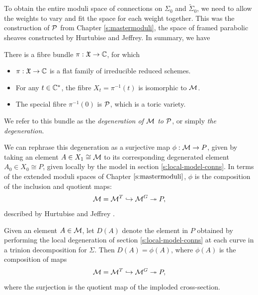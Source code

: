	To obtain the entire moduli space of connections on $\Sigma_0$ and $\tilde{\Sigma}_0$, we need to allow the weights to vary and fit the space for each weight together. This was the construction of $\mathcal{P}$ from Chapter \ref{s:mastermoduli}, the space of framed parabolic sheaves constructed by Hurtubise and Jeffrey. In summary, we have \cite[Theorems 3.17, 4.1]{biswas_degenerations_2021}
	\begin{theorem}
		\label{t:bishurt}
		There is a fibre bundle $\pi: \mathfrak{X} \to \mathbb{C}$, for which
		\begin{itemize}
			\item $\pi:\mathfrak{X}\to \mathbb{C}$ is a flat family of irreducible reduced schemes.
			\item For any $t\in \mathbb{C}^\ast$, the fibre $X_t = \pi^{-1}(t)$ is isomorphic to $\mathcal{M}$.
			\item The special fibre $\pi^{-1}(0)$ is $\mathcal{P}$, which is a toric variety.
		\end{itemize}
		We refer to this bundle as the \emph{degeneration of $\mathcal{M}$ to $\mathcal{P}$}, or simply \emph{the degeneration}.
	\end{theorem}
	We can rephrase this degeneration as a surjective map $\phi:\mathcal{M}\to P$, given by taking an element $A\in X_1 \cong \mathcal{M}$ to its corresponding degenerated element $A_0 \in X_0 \cong P$, given locally by the model in section \ref{s:local-model-conns}. In terms of the extended moduli spaces of Chapter $\ref{s:mastermoduli}$, $\phi$ is the composition of the inclusion and quotient maps:
	\begin{equation}
		\mathcal{M} = \mathcal{M}^T \hookrightarrow \mathcal{M}^G \twoheadrightarrow P,
	\end{equation}
	described by Hurtubise and Jeffrey \cite[prop 2.37]{hurtubise_representations_2000}. 
	\begin{lemma}
		\label{l:degen-equal}
		Given an element $A\in \mathcal{M}$, let $D(A)$ denote the element in $P$ obtained by performing the local degeneration of section \ref{s:local-model-conns} at each curve in a trinion decomposition for $\Sigma$. Then $D(A) = \phi(A)$, where $\phi(A)$ is the composition of maps 
		\begin{equation}
			\mathcal{M} = \mathcal{M}^T \hookrightarrow \mathcal{M}^G \twoheadrightarrow P,
		\end{equation}
		where the surjection is the quotient map of the imploded cross-section.
	\end{lemma}
